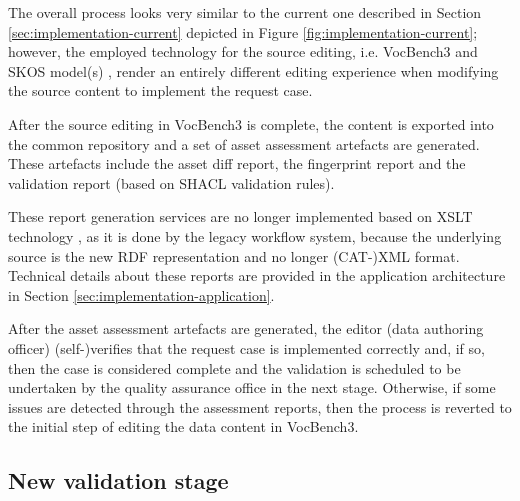 	The overall process looks very similar to the current one described in Section \ref{sec:implementation-current} depicted in Figure \ref{fig:implementation-current}; however, the employed technology for the source editing, i.e. VocBench3 \citep{stellatovocbench} and SKOS model(s) \citep{skos-spec}, render an entirely different editing experience when modifying the source content to implement the request case.
	
	After the source editing in VocBench3 is complete, the content is exported into the common repository and a set of asset assessment artefacts are generated. These artefacts include the asset diff report, the fingerprint report and the validation report (based on SHACL \citep{shacl-spec} validation rules). 
	
	These report generation services are no longer implemented based on XSLT technology \citep{xslt3-Kay}, as it is done by the legacy workflow system, because the underlying source is the new RDF representation \citep{rdf11} and no longer (CAT-)XML format. Technical details about these reports are provided in the application architecture in Section \ref{sec:implementation-application}.
	
	After the asset assessment artefacts are generated, the editor (data authoring officer) (self-)verifies that the request case is implemented correctly and, if so, then the case is considered complete and the validation is scheduled to be undertaken by the quality assurance office in the next stage. Otherwise, if some issues are detected through the assessment reports, then the process is reverted to the initial step of editing the data content in VocBench3.

	\subsection{New validation stage}
	\label{sec:validation-new}	
	
